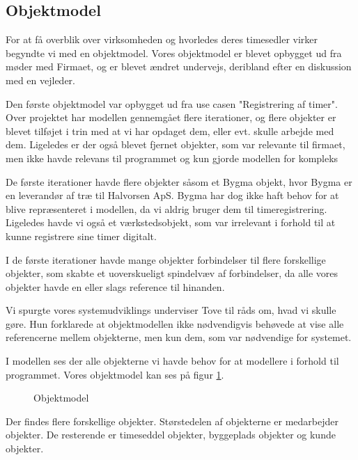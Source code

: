 \subsection{Objektmodel}

For at få overblik over virksomheden og hvorledes deres timesedler virker begyndte vi med en objektmodel.
Vores objektmodel er blevet opbygget ud fra møder med Firmaet, og er blevet ændret undervejs, deribland efter en diskussion med en vejleder.

Den første objektmodel var opbygget ud fra use casen "Registrering af timer".
Over projektet har modellen gennemgået flere iterationer, og flere objekter er blevet tilføjet i trin med at vi har opdaget dem, eller evt. skulle arbejde med dem.
Ligeledes er der også blevet fjernet objekter, som var relevante til firmaet, men ikke havde relevans til programmet og kun gjorde modellen for kompleks

De første iterationer havde flere objekter såsom et Bygma objekt, hvor Bygma er en leverandør af træ til Halvorsen ApS. Bygma har dog ikke haft behov for at blive repræsenteret i modellen, da vi aldrig bruger dem til timeregistrering.
Ligeledes havde vi også et værkstedsobjekt, som var irrelevant i forhold til at kunne registrere sine timer digitalt.

I de første iterationer havde mange objekter forbindelser til flere forskellige objekter, som skabte et uoverskueligt spindelvæv af forbindelser, da alle vores objekter havde en eller slags reference til hinanden. 

Vi spurgte vores systemudviklings underviser Tove til råds om, hvad vi skulle gøre. Hun forklarede at objektmodellen ikke nødvendigvis behøvede at vise alle referencerne mellem objekterne, men kun dem, som var nødvendige for systemet.

I modellen ses der alle objekterne vi havde behov for at modellere i forhold til programmet. Vores objektmodel kan ses på figur \ref{fig:Objektmodel}.

\begin{figure}[H]
    \caption{Objektmodel}
    \label{fig:Objektmodel}
\end{figure}

Der findes flere forskellige objekter. Størstedelen af objekterne er medarbejder objekter. De resterende er timeseddel objekter, byggeplads objekter og kunde objekter. 
